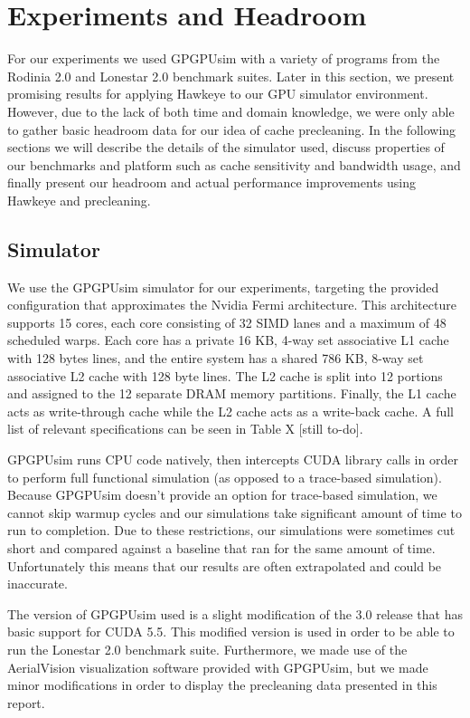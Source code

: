 \chapter{Experiments and Headroom}

For our experiments we used GPGPUsim with a variety of programs from the Rodinia 2.0 and Lonestar 2.0 benchmark suites. Later in this section, we present promising results for applying Hawkeye to our GPU simulator environment. However, due to the lack of both time and domain knowledge, we were only able to gather basic headroom data for our idea of cache precleaning. In the following sections we will describe the details of the simulator used, discuss properties of our benchmarks and platform such as cache sensitivity and bandwidth usage, and finally present our headroom and actual performance improvements using Hawkeye and precleaning.

\section{Simulator}
We use the GPGPUsim \cite{gpgpusim} simulator for our experiments, targeting the provided configuration that approximates the Nvidia Fermi architecture. This architecture supports 15 cores, each core consisting of 32 SIMD lanes and a maximum of 48 scheduled warps. Each core has a private 16 KB, 4-way set associative L1 cache with 128 bytes lines, and the entire system has a shared 786 KB, 8-way set associative L2 cache with 128 byte lines. The L2 cache is split into 12 portions and assigned to the 12 separate DRAM memory partitions. Finally, the L1 cache acts as write-through cache while the L2 cache acts as a write-back cache. A full list of relevant specifications can be seen in Table X [still to-do].

GPGPUsim runs CPU code natively, then intercepts CUDA library calls in order to perform full functional simulation (as opposed to a trace-based simulation). Because GPGPUsim doesn’t provide an option for trace-based simulation, we cannot skip warmup cycles and our simulations take significant amount of time to run to completion. Due to these restrictions, our simulations were sometimes cut short and compared against a baseline that ran for the same amount of time. Unfortunately this means that our results are often extrapolated and could be inaccurate.

The version of GPGPUsim used is a slight modification of the 3.0 release that has basic support for CUDA 5.5. This modified version is used in order to be able to run the Lonestar 2.0 benchmark suite. Furthermore, we made use of the AerialVision \cite{aerialvision} visualization software provided with GPGPUsim, but we made minor modifications in order to display the precleaning data presented in this report.

